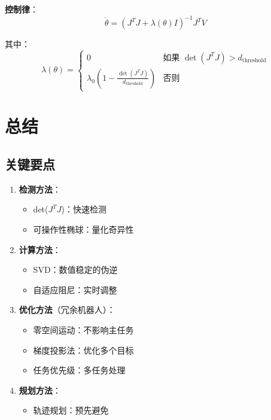 \documentclass[12pt,a4paper]{article}
\begin{document}
\textbf{控制律}：
\begin{equation}
\dot{\theta} = (J^T J + \lambda(\theta) I)^{-1}J^T V
\end{equation}

其中：
\begin{equation}
\lambda(\theta) = \begin{cases}
0 & \text{如果 } \det(J^T J) > d_{\text{threshold}} \\
\lambda_0\left(1 - \frac{\det(J^T J)}{d_{\text{threshold}}}\right) & \text{否则}
\end{cases}
\end{equation}

\section{总结}

\subsection{关键要点}

\begin{enumerate}
\item \textbf{检测方法}：
\begin{itemize}
\item det($J^T J$)：快速检测
\item 可操作性椭球：量化奇异性
\end{itemize}

\item \textbf{计算方法}：
\begin{itemize}
\item SVD：数值稳定的伪逆
\item 自适应阻尼：实时调整
\end{itemize}

\item \textbf{优化方法}（冗余机器人）：
\begin{itemize}
\item 零空间运动：不影响主任务
\item 梯度投影法：优化多个目标
\item 任务优先级：多任务处理
\end{itemize}

\item \textbf{规划方法}：
\begin{itemize}
\item 轨迹规划：预先避免
\end{itemize}
\end{enumerate}
\end{document}
